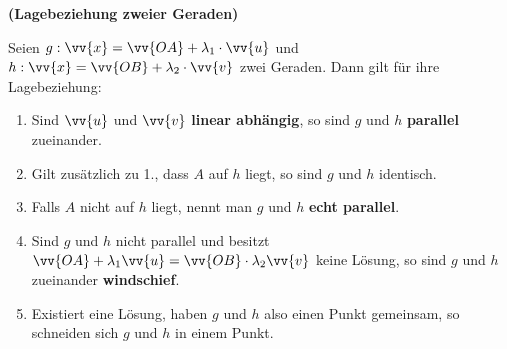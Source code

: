 \documentclass[ngerman, 12pt]{nssheetxea}
\begin{document}
\begin{theorem} \textbf{(Lagebeziehung zweier Geraden) } \par
Seien $g:\vv{x}=\vv{OA}+\lambda_1 \cdot \vv{u}$ und $h:\vv{x}=\vv{OB}+\lambda_2 \cdot \vv{v}$ zwei Geraden. Dann gilt für ihre Lagebeziehung:
\begin{enumerate}
\item Sind $\vv{u}$ und $\vv{v}$ \textbf{linear abhängig}, so sind $g$ und $h$ \textbf{parallel} zueinander. 
\item Gilt zusätzlich zu 1., dass $A$ auf $h$ liegt, so sind $g$ und $h$ identisch.
\item Falls $A$ nicht auf $h$ liegt, nennt man $g$ und $h$ \textbf{echt parallel}.
\item Sind $g$ und $h$ nicht parallel und besitzt $\vv{OA}+\lambda_1 \vv{u} = \vv{OB}\cdot \lambda_2\vv{v}$ keine Lösung, so sind $g$ und $h$ zueinander \textbf{windschief}. 
\item Existiert eine Lösung, haben $g$ und $h$ also einen Punkt gemeinsam, so schneiden sich $g$ und $h$ in einem Punkt. 
\end{enumerate}
\end{theorem}
\end{document}

